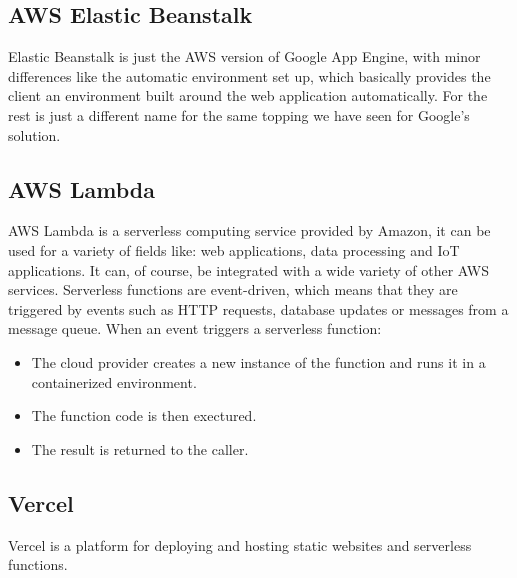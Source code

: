 \subsection{AWS Elastic Beanstalk}
Elastic Beanstalk is just the AWS version of Google App Engine, with minor differences like the automatic environment set up, which basically provides the client an environment built around the web application automatically. For the rest is just a different name for the same topping we have seen for Google's solution.
\subsection{AWS Lambda}
AWS Lambda is a serverless computing service provided by Amazon, it can be used for a variety of fields like: web applications, data processing and IoT applications. It can, of course, be integrated with a wide variety of other AWS services. \n
Serverless functions are event-driven, which means that they are triggered by events such as HTTP requests, database updates or messages from a message queue. When an event triggers a serverless function:
\begin{itemize}
    \item The cloud provider creates a new instance of the function and runs it in a containerized environment.
    \item The function code is then exectured.
    \item The result is returned to the caller.
\end{itemize}
\subsection{Vercel}
Vercel is a platform for deploying and hosting static websites and serverless functions.
